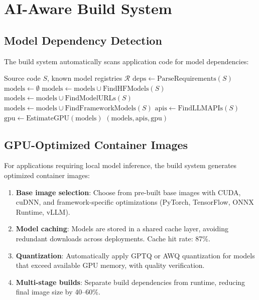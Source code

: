 \documentclass[11pt,twocolumn]{article}
\begin{document}
\section{AI-Aware Build System}
\label{sec:build}

\subsection{Model Dependency Detection}

The build system automatically scans application code for model dependencies:

\begin{algorithm}[H]
\caption{Model Dependency Detection}
\label{alg:detect}
\begin{algorithmic}[1]
\Require Source code $S$, known model registries $\mathcal{R}$
\State $\text{deps} \gets \text{ParseRequirements}(S)$ 
\State $\text{models} \gets \emptyset$
\State {}
\State $\text{models} \gets \text{models} \cup \text{FindHFModels}(S)$
\State {}
\State $\text{models} \gets \text{models} \cup \text{FindModelURLs}(S)$
\State {}
\State $\text{models} \gets \text{models} \cup \text{FindFrameworkModels}(S)$
\State {}
\State $\text{apis} \gets \text{FindLLMAPIs}(S)$
\State {}
\State $\text{gpu} \gets \text{EstimateGPU}(\text{models})$
\State \Return $(\text{models}, \text{apis}, \text{gpu})$
\end{algorithmic}
\end{algorithm}

\subsection{GPU-Optimized Container Images}

For applications requiring local model inference, the build system generates optimized container images:

\begin{enumerate}[leftmargin=1.4em]
    \item \textbf{Base image selection}: Choose from pre-built base images with CUDA, cuDNN, and framework-specific optimizations (PyTorch, TensorFlow, ONNX Runtime, vLLM).
    \item \textbf{Model caching}: Models are stored in a shared cache layer, avoiding redundant downloads across deployments. Cache hit rate: 87\%.
    \item \textbf{Quantization}: Automatically apply GPTQ or AWQ quantization for models that exceed available GPU memory, with quality verification.
    \item \textbf{Multi-stage builds}: Separate build dependencies from runtime, reducing final image size by 40--60\%.
\end{enumerate}
\end{document}
